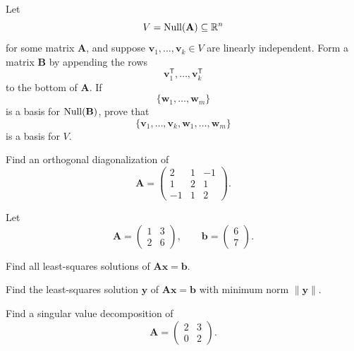 \begin{problem}
Let
\[
V=\operatorname{Null}(\mathbf A)\subseteq\mathbb{R}^n
\]
for some matrix $\mathbf A$, and suppose $\mathbf v_1,\dots,\mathbf v_k\in V$ are linearly independent. Form a matrix $\mathbf B$ by appending the rows
\[
\mathbf v_1^{\mathsf T},\dots,\mathbf v_k^{\mathsf T}
\]
to the bottom of $\mathbf A$. If
\[
\{\mathbf w_1,\dots,\mathbf w_m\}
\]
is a basis for $\operatorname{Null}(\mathbf B)$, prove that
\[
\{\mathbf v_1,\dots,\mathbf v_k,\mathbf w_1,\dots,\mathbf w_m\}
\]
is a basis for $V$.
\end{problem}

\begin{problem}
Find an orthogonal diagonalization of
\[
\mathbf A=
\begin{pmatrix}
2&1&-1\\
1&2&1\\
-1&1&2
\end{pmatrix}.
\]
\end{problem}

\begin{problem}
Let
\[
\mathbf A=
\begin{pmatrix}
1&3\\
2&6
\end{pmatrix},
\qquad
\mathbf b=
\begin{pmatrix}
6\\7
\end{pmatrix}.
\]
\begin{problemsubparts}
\item Find all least-squares solutions of $\mathbf A\mathbf x=\mathbf b$.
\item Find the least-squares solution $\mathbf y$ of $\mathbf A\mathbf x=\mathbf b$ with minimum norm $\|\mathbf y\|$.
\end{problemsubparts}
\end{problem}

\begin{problem}
Find a singular value decomposition of
\[
\mathbf A=
\begin{pmatrix}
2&3\\
0&2
\end{pmatrix}.
\]
\end{problem}

